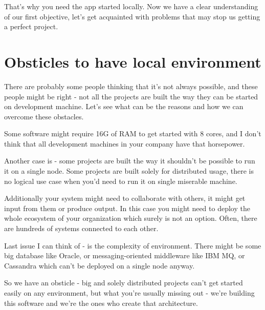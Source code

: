 \documentclass[11pt,a4paper,oneside]{article}
\begin{document}
That's why you need the app started locally. Now we have a clear understanding of our first objective, let's get acquainted with problems that may stop us getting a perfect project.

\section{Obsticles to have local environment}

There are probably some people thinking that it's not always possible, and these people might be right - not all the projects are built the way they can be started on development machine. Let's see what can be the reasons and how we can overcome these obstacles.

Some software might require 16G of RAM to get started with 8 cores, and I don't think that all development machines in your company have that horsepower. 

Another case is - some projects are built the way it shouldn't be possible to run it on a single node. Some projects are built solely for distributed usage, there is no logical use case when you'd need to run it on single miserable machine.

Additionally your system might need to collaborate with others, it might get input from them or produce output. In this case you might need to deploy the whole ecosystem of your organization which surely is not an option. Often, there are hundreds of systems connected to each other.

Last issue I can think of - is the complexity of environment. There might be some big database like Oracle, or messaging-oriented middleware like IBM MQ, or Cassandra which can't be deployed on a single node anyway. 

So we have an obsticle - big and solely distributed projects can't get started easily on any environment, but what you're usually missing out - we're building this software and we're the ones who create that architecture. 
\end{document}
